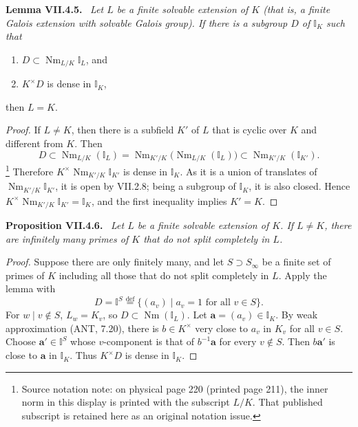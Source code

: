 \documentclass[11pt]{article}
\newcommand{\I}{\mathbb I}
\newcommand{\Nm}{\operatorname{Nm}}
\newenvironment{authorresult}[2]{\par\medskip\noindent\textbf{#1 VII.#2.}\ \itshape}{\par\medskip}
\begin{document}
\begin{authorresult}{Lemma}{4.5}
Let $L$ be a finite solvable extension of $K$ (that is, a finite Galois
extension with solvable Galois group). If there is a subgroup $D$ of $\I_K$
such that
\begin{enumerate}
\item[(a)] $D\subset\Nm_{L/K}\I_L$, and
\item[(b)] $K^\times D$ is dense in $\I_K$,
\end{enumerate}
then $L=K$.
\end{authorresult}
\begin{proof}
If $L\ne K$, then there is a subfield $K'$ of $L$ that is cyclic over $K$
and different from $K$. Then
\[
 D\subset\Nm_{L/K}(\I_L)
 =\Nm_{K'/K}\bigl(\Nm_{L/K}(\I_L)\bigr)
 \subset\Nm_{K'/K}(\I_{K'}).
\]
\footnote{Source notation note: on physical page 220 (printed page 211),
the inner norm in this display is printed with the subscript $L/K$.
That published subscript is retained here as an original notation issue.}
Therefore $K^\times\Nm_{K'/K}\I_{K'}$ is dense in $\I_K$. As it is a union
of translates of $\Nm_{K'/K}\I_{K'}$, it is open by VII.2.8; being a
subgroup of $\I_K$, it is also closed. Hence
$K^\times\Nm_{K'/K}\I_{K'}=\I_K$, and the first inequality implies $K'=K$.
\end{proof}

\begin{authorresult}{Proposition}{4.6}
Let $L$ be a finite solvable extension of $K$. If $L\ne K$, there are
infinitely many primes of $K$ that do not split completely in $L$.
\end{authorresult}
\begin{proof}
Suppose there are only finitely many, and let $S\supset S_\infty$ be a finite
set of primes of $K$ including all those that do not split completely in $L$.
Apply the lemma with
\[
 D=\I^S\overset{\mathrm{def}}=
 \{(a_v)\mid a_v=1\text{ for all }v\in S\}.
\]
For $w\mid v\notin S$, $L_w=K_v$, so $D\subset\Nm(\I_L)$.
Let $\mathbf a=(a_v)\in\I_K$. By weak approximation (ANT, 7.20), there is
$b\in K^\times$ very close to $a_v$ in $K_v$ for all $v\in S$.
Choose $\mathbf a'\in\I^S$ whose $v$-component is that of
$b^{-1}\mathbf a$ for every $v\notin S$. Then $b\mathbf a'$ is close to
$\mathbf a$ in $\I_K$. Thus $K^\times D$ is dense in $\I_K$.
\end{proof}
\end{document}
